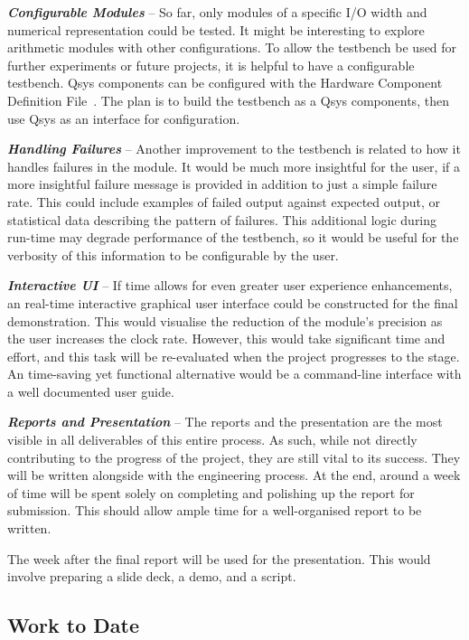 \textit{\textbf{Configurable Modules}} --
So far, only modules of a specific I/O width and numerical representation
could be tested.
It might be interesting to explore arithmetic modules with other configurations.
To allow the testbench be used for further experiments or future projects,
it is helpful to have a configurable testbench.
Qsys components can be configured with the Hardware Component Definition
File~\cite{Altera5}.
The plan is to build the testbench as a Qsys components, then use Qsys as an
interface for configuration.

\textit{\textbf{Handling Failures}} --
Another improvement to the testbench is related to how it handles failures
in the module.
It would be much more insightful for the user, if a more insightful failure
message is provided in addition to just a simple failure rate.
This could include examples of failed output against expected output,
or statistical data describing the pattern of failures.
This additional logic during run-time may degrade performance of the testbench,
so it would be useful for the verbosity of this information to be configurable
by the user.

\textit{\textbf{Interactive UI}} --
If time allows for even greater user experience enhancements, an real-time
interactive graphical user interface could be constructed for the final
demonstration.
This would visualise the reduction of the module's precision as the user
increases the clock rate.
However, this would take significant time and effort, and this task will
be re-evaluated when the project progresses to the stage.
An time-saving yet functional alternative would be a command-line interface
with a well documented user guide.

\textit{\textbf{Reports and Presentation}} --
The reports and the presentation are the most visible in all deliverables of
this entire process.
As such, while not directly contributing to the progress of the project,
they are still vital to its success.
They will be written alongside with the engineering process.
At the end, around a week of time will be spent solely on completing and
polishing up the report for submission.
This should allow ample time for a well-organised report to be written.

The week after the final report will be used for the presentation.
This would involve preparing a slide deck, a demo, and a script.

\subsection{Work to Date}

